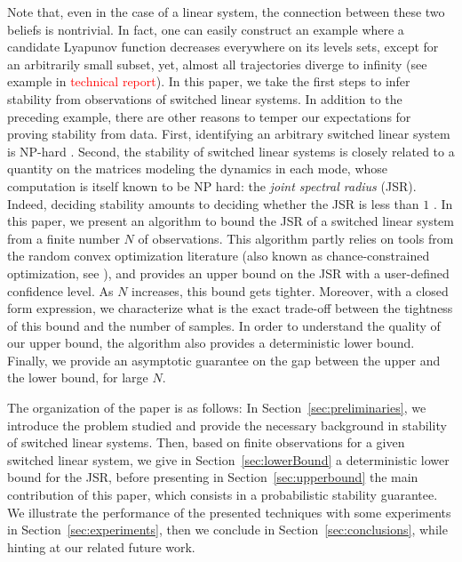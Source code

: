 Note that, even in the case of a linear system, the connection between these two beliefs is nontrivial. In fact, one can easily construct an example where a candidate Lyapunov function decreases everywhere on its levels sets, except for an arbitrarily small subset, yet, almost all trajectories diverge to infinity (see example in \textcolor{red}{technical report}). In this paper, we take the first steps to infer stability from observations of switched linear systems. In addition to the preceding example, there are other reasons to temper our expectations for proving stability from data. First,  identifying an arbitrary switched linear system is NP-hard \cite{jungers_lncis}. Second, the stability of switched linear systems is closely related to a quantity on the matrices modeling the dynamics in each mode, whose computation is itself known to be NP hard: the \emph{joint spectral radius} (JSR). Indeed, deciding stability amounts to deciding whether the JSR is less than $1$ \cite{jungers_lncis}. In this paper, we present an algorithm to bound the JSR of a switched linear system from a finite number $N$ of observations. This algorithm partly relies on tools from the random convex optimization literature (also known as chance-constrained optimization, see \cite{campi,nemirovski,campi-garatti}), and provides an upper bound on the JSR with a user-defined confidence level. As $N$ increases, this bound gets tighter. Moreover, with a closed form expression, we characterize what is the exact trade-off between the tightness of this bound and the number of samples. In order to understand the quality of our upper bound, the algorithm also provides a deterministic lower bound. Finally, we provide an asymptotic guarantee on the gap between the upper and the lower bound, for large $N$.


The organization of the paper is as follows: In Section~\ref{sec:preliminaries}, we introduce the problem studied and provide the necessary background in stability of switched linear systems. Then, based on finite observations for a given switched linear system, we give in Section~\ref{sec:lowerBound} a deterministic lower bound for the JSR, before presenting in Section~\ref{sec:upperbound} the main contribution of this paper, which consists in a probabilistic stability guarantee. We illustrate the performance of the presented techniques with some experiments in Section~\ref{sec:experiments}, then we conclude in Section~\ref{sec:conclusions}, while hinting at our related future work.